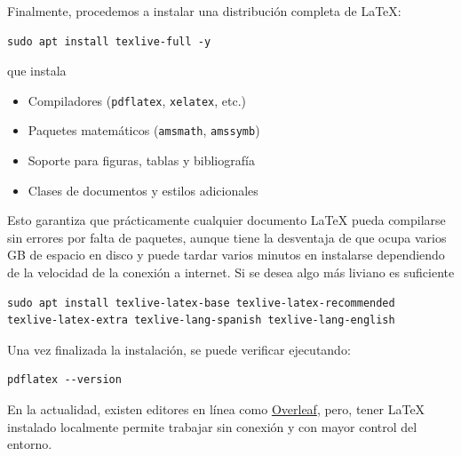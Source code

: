 \documentclass[12pt]{article}
\begin{document}
Finalmente, procedemos a instalar una distribución completa de \LaTeX:
\begin{lstlisting}
sudo apt install texlive-full -y
\end{lstlisting}
que instala
\begin{itemize}
    \item Compiladores (\texttt{pdflatex}, \texttt{xelatex}, etc.)
    \item Paquetes matemáticos (\texttt{amsmath}, \texttt{amssymb})
    \item Soporte para figuras, tablas y bibliografía
    \item Clases de documentos y estilos adicionales
\end{itemize}
Esto garantiza que prácticamente cualquier documento \LaTeX{} pueda compilarse 
sin errores por falta de paquetes, aunque tiene la desventaja de que ocupa varios GB de espacio en disco y 
puede tardar varios minutos en instalarse dependiendo de la velocidad de la conexión a internet.
Si se desea algo más liviano es suficiente 
\begin{lstlisting}
sudo apt install texlive-latex-base texlive-latex-recommended 
texlive-latex-extra texlive-lang-spanish texlive-lang-english
\end{lstlisting}
Una vez finalizada la instalación, se puede verificar ejecutando:
\begin{lstlisting}
pdflatex --version
\end{lstlisting}
En la actualidad, existen editores en línea como \href{https://www.overleaf.com/project}{Overleaf}, pero, tener \LaTeX{} instalado localmente 
permite trabajar sin conexión y con mayor control del entorno.
\end{document}
